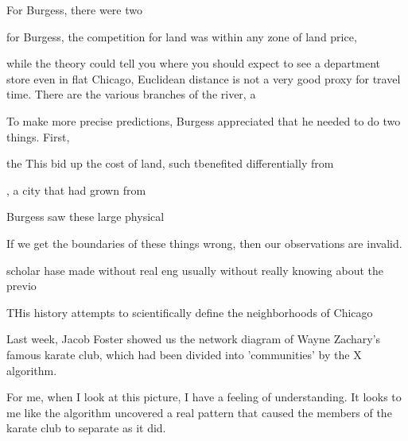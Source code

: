 For Burgess, there were two 




for Burgess, the competition for land was within any zone of land price, 

while the theory could tell you where you should expect to see a department store even in flat Chicago, Euclidean distance is not a very
good proxy for travel time. There are the various branches of the river, a

To make more precise predictions, Burgess appreciated that he
needed to do two things. First, 







the This bid up the cost of land, such tbenefited differentially from 



, a city that had grown from 

Burgess saw these large physical  

If we get the boundaries of these things wrong, then our
  observations are invalid.





 scholar  hase made without real eng usually without really knowing about the previo

THis history attempts to scientifically
define the neighborhoods of Chicago

















Last week, Jacob Foster showed us the network diagram of Wayne
Zachary's famous karate club, which had been divided into
'communities' by the X algorithm. 





\testframe{}



For me, when I look at this picture, I have a feeling of
understanding. It looks to me like the algorithm uncovered a real
pattern that caused the members of the karate club to separate as it
did. 

